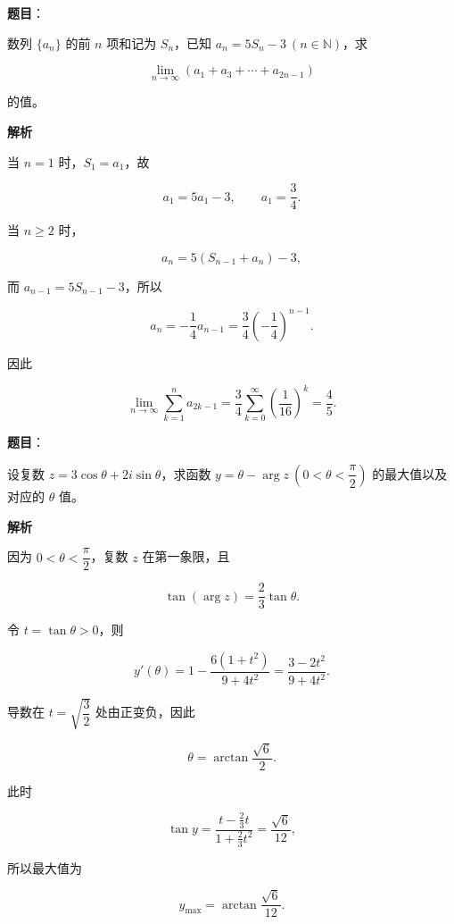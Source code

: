 \begin{answer}

\textbf{题目}：

数列 $\{a_n\}$ 的前 $n$ 项和记为 $S_n$，已知 $a_n=5S_n-3\ (n\in\mathbb N)$，求

\nopagebreak[4]
\[
\lim_{n\to\infty}(a_1+a_3+\cdots+a_{2n-1})
\]

的值。

\textbf{解析}

当 $n=1$ 时，$S_1=a_1$，故

\nopagebreak[4]
\[
a_1=5a_1-3,\qquad a_1=\frac34.
\]

当 $n\ge2$ 时，

\nopagebreak[4]
\[
a_n=5(S_{n-1}+a_n)-3,
\]

而 $a_{n-1}=5S_{n-1}-3$，所以

\nopagebreak[4]
\[
a_n=-\frac14a_{n-1}
=\frac34\left(-\frac14\right)^{n-1}.
\]

因此

\nopagebreak[4]
\[
\lim_{n\to\infty}\sum_{k=1}^n a_{2k-1}
=\frac34\sum_{k=0}^{\infty}\left(\frac1{16}\right)^k
=\frac45.
\]


\end{answer}
\begin{answer}

\textbf{题目}：

设复数 $z=3\cos\theta+2i\sin\theta$，求函数 $y=\theta-\arg z\ \left(0<\theta<\dfrac\pi2\right)$ 的最大值以及对应的 $\theta$ 值。

\textbf{解析}

因为 $0<\theta<\dfrac\pi2$，复数 $z$ 在第一象限，且

\nopagebreak[4]
\[
\tan(\arg z)=\frac23\tan\theta.
\]

令 $t=\tan\theta>0$，则

\nopagebreak[4]
\[
y'(\theta)
=1-\frac{6(1+t^2)}{9+4t^2}
=\frac{3-2t^2}{9+4t^2}.
\]

导数在 $t=\sqrt{\dfrac32}$ 处由正变负，因此

\nopagebreak[4]
\[
\theta=\arctan\frac{\sqrt6}{2}.
\]

此时

\nopagebreak[4]
\[
\tan y
=\frac{t-\frac23t}{1+\frac23t^2}
=\frac{\sqrt6}{12},
\]

所以最大值为

\nopagebreak[4]
\[
y_{\max}=\arctan\frac{\sqrt6}{12}.
\]


\end{answer}
